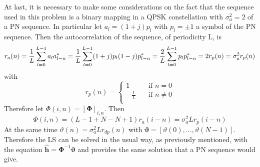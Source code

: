 \documentclass[10pt]{article}
\begin{document}
At last, it is necessary to make some considerations on the fact that the sequence used in this problem is a binary mapping in a QPSK constellation with $\sigma_a^2 = 2$ of a PN sequence. In particular let $a_l = (1+j) p_l$ with $p_l = \pm 1$ a symbol of the PN sequence. Then the autocorrelation of the sequence, of periodicity L, is
\begin{equation}
	r_a(n) = \frac{1}{L}\sum_{l = 0}^{L-1} a_l a^*_{l-n} = \\
	\frac{1}{L}\sum_{l = 0}^{L-1} (1+j)p_l (1-j)p^*_{l-n} = 
	\frac{2}{L} \sum_{l= 0}^{L-1} p_l p^*_{l-n} = 2 r_p(n) = \sigma_a^2 r_p(n)
\end{equation}
with 
\begin{equation}
	r_p(n) = 
  	\begin{cases}
    1       & \quad \text{if } n =0 \\
    -\frac{1}{L}  & \quad \text{if } n \neq 0 \\
  \end{cases}
\end{equation}
Therefore let $\Phi(i, n) = [\mathbf{\Phi}]_{i, n}$. Then
\begin{equation}
	\Phi(i, n) = (L -1 + N - N + 1)r_a(i-n) = \sigma_a^2 Lr_p(i-n)
\end{equation}
At the same time $\vartheta(n) = \sigma_a^2 Lr_{dp}(n)$ with $\boldsymbol{\vartheta} = [\vartheta(0), \dots, \vartheta(N-1)]$.
Therefore the LS can be solved in the usual way, as previously mentioned, with the equation $\hat{\mathbf{h}}= \mathbf{\Phi}^{-1} \boldsymbol{\vartheta}$ and provides the same solution that a PN sequence would give. 
\end{document}
